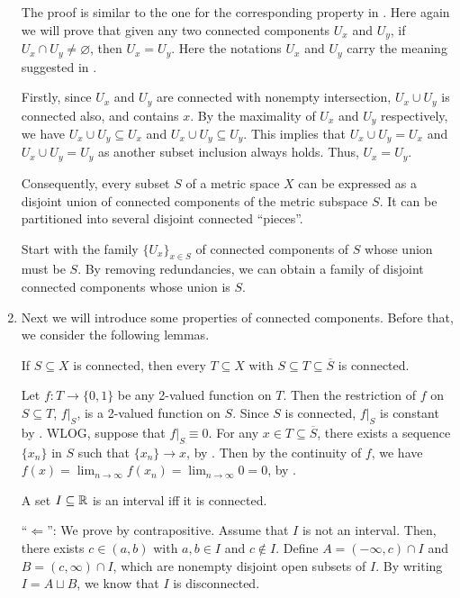 \begin{enumerate}
\begin{pf}
The proof is similar to the one for the corresponding property in
. Here again we will prove that given any two
connected components \(U_x\) and \(U_y\), if \(U_x\cap U_y\ne\varnothing\),
then \(U_x=U_y\). Here the notations \(U_x\) and \(U_y\) carry the meaning
suggested in .

Firstly, since \(U_x\) and \(U_y\) are connected with nonempty intersection,
\(U_x\cup U_y\) is connected also, and contains \(x\).  By the maximality of
\(U_x\) and \(U_y\) respectively, we have \(U_x\cup U_y\subseteq U_x\) and
\(U_x\cup U_y\subseteq U_y\). This implies that \(U_x\cup U_y=U_x\) and
\(U_x\cup U_y=U_y\) as another subset inclusion always holds. Thus,
\(U_x=U_y\).
\end{pf}
Consequently, every subset \(S\) of a metric space \(X\) can be expressed as a
disjoint union of connected components of the metric subspace \(S\). It can be
partitioned into several disjoint connected ``pieces''.

\begin{pf}
Start with the family \(\{U_x\}_{x\in S}\) of connected components of \(S\)
whose union must be \(S\). By removing redundancies, we can obtain a family of
disjoint connected components whose union is \(S\).
\end{pf}

\item Next we will introduce some properties of connected components. Before
that, we consider the following lemmas.
\begin{lemma}
\label{lma:set-btw-s-clos-conn}
If \(S\subseteq X\) is connected, then every \(T\subseteq X\) with \(S\subseteq
T\subseteq \overline{S}\) is connected.
\end{lemma}
\begin{pf}
Let \(f:T\to\{0,1\}\) be any 2-valued function on \(T\). Then the restriction
of \(f\) on \(S\subseteq T\), \(f|_S\), is a 2-valued function on \(S\). Since
\(S\) is connected, \(f|_S\) is constant by . WLOG,
suppose that \(f|_S\equiv 0\). For any \(x\in T\subseteq \overline{S}\), there
exists a sequence \(\{x_n\}\) in \(S\) such that \(\{x_n\}\to x\), by
. Then by the continuity of \(f\), we have
\(f(x)=\lim_{n\to \infty}f(x_n)=\lim_{n\to \infty}0=0\), by
.
\end{pf}
\begin{lemma}
\label{lma:int-conn}
A set \(I\subseteq \mathbb{R}\) is an interval iff it is connected.
\end{lemma}
\begin{pf}
``\(\Leftarrow\)'': We prove by contrapositive. Assume that \(I\) is not an
interval. Then, there exists \(c\in (a,b)\) with \(a,b\in I\) and \(c\notin
I\). Define \(A=(-\infty,c)\cap I\) and \(B=(c,\infty)\cap I\), which are
nonempty disjoint open subsets of \(I\). By writing \(I=A\sqcup B\),
we know that \(I\) is disconnected.


\end{pf}
\end{enumerate}
